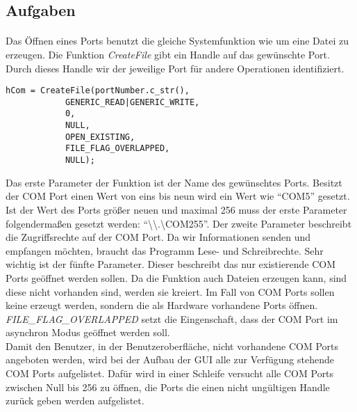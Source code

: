 \subsection{Aufgaben}
\paragraph{}
Das Öffnen eines Ports benutzt die gleiche Systemfunktion wie um eine Datei zu erzeugen. Die Funktion \textit{CreateFile} gibt ein Handle auf das gewünschte Port. Durch dieses Handle wir der jeweilige Port für andere Operationen identifiziert.

\begin{lstlisting}	 
hCom = CreateFile(portNumber.c_str(),  
            GENERIC_READ|GENERIC_WRITE,
            0, 
            NULL,
            OPEN_EXISTING, 
            FILE_FLAG_OVERLAPPED,
            NULL); 

\end{lstlisting}

Das erste Parameter der Funktion ist der Name des gewünschtes Ports. Besitzt der COM Port einen Wert von eins bis neun wird ein Wert wie "`COM5"' gesetzt. Ist der Wert des Ports größer neuen und maximal 256 muss der erste Parameter folgendermaßen gesetzt werden: "`\textbackslash\textbackslash.\textbackslash COM255"'. Der zweite Parameter beschreibt die Zugriffsrechte auf der COM Port. Da wir Informationen senden und empfangen möchten, braucht das Programm Lese- und Schreibrechte. Sehr wichtig ist der fünfte Parameter. Dieser beschreibt das nur existierende COM Ports geöffnet werden sollen. Da die Funktion auch Dateien erzeugen kann, sind diese nicht vorhanden sind, werden sie kreiert. Im Fall von COM Ports sollen keine erzeugt werden, sondern die als Hardware vorhandene Ports öffnen. \textit{FILE\_FLAG\_OVERLAPPED} setzt die Eingenschaft, dass der COM Port im asynchron Modus geöffnet werden soll.\\

Damit den Benutzer, in der Benutzeroberfläche, nicht vorhandene COM Ports angeboten werden, wird bei der Aufbau der GUI alle zur Verfügung stehende COM Ports aufgelistet. Dafür wird in einer Schleife versucht alle COM Ports zwischen Null bis 256 zu öffnen, die Ports die einen nicht ungültigen Handle zurück geben werden aufgelistet.\\


